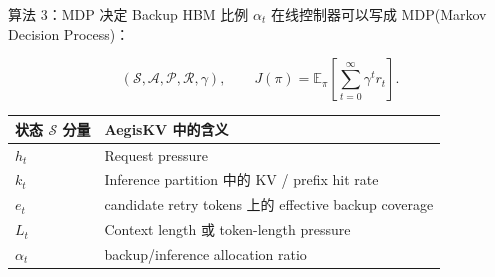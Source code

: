 \documentclass[aspectratio=43]{beamer}
\begin{document}
\begin{frame}{算法 3：MDP 决定 Backup HBM 比例 $\alpha_t$}
  \small
  在线控制器可以写成 MDP(Markov Decision Process)\cite{yu2026poolcachesadaptivehbm}：

  \vspace{0.04cm}
  \[
    (\mathcal{S},\mathcal{A},\mathcal{P},\mathcal{R},\gamma),
    \qquad
    J(\pi)=\mathbb{E}_{\pi}\left[\sum_{t=0}^{\infty}\gamma^t r_t\right].
  \]

  \vspace{-0.05cm}
  \scriptsize
  \renewcommand{\arraystretch}{1.10}
  \begin{tabular}{p{}p{}}
    \toprule
    状态 $\mathcal{S}$ 分量 & AegisKV 中的含义 \\
    \midrule
    $h_t$ & Request pressure \\
    $k_t$ & Inference partition 中的 KV / prefix hit rate \\
    $e_t$ & candidate retry tokens 上的 effective backup coverage \\
    $L_t$ & Context length 或 token-length pressure \\
    $\alpha_t$ & backup/inference allocation ratio \\
    \bottomrule
  \end{tabular}

\end{frame}


\end{document}
